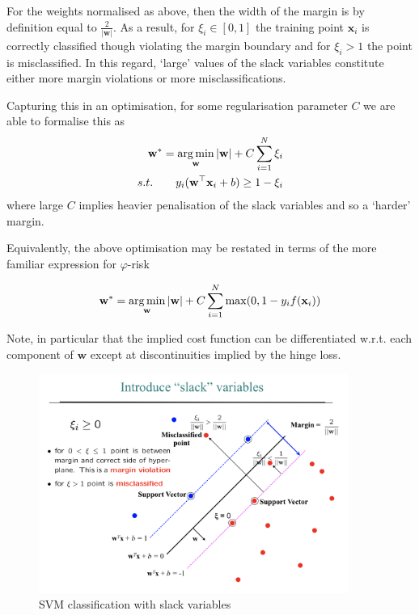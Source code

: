 For the weights normalised as above, then the width of the margin is by definition equal to $\frac{2}{|\mathbf{w}|}$. As a result, for $\xi_i \in [0,1]$ the training point $\mathbf{x}_i$ is correctly classified though violating the margin boundary and for $\xi_i>1$ the point is misclassified. In this regard, `large' values of the slack variables constitute either more margin violations or more misclassifications.

Capturing this in an optimisation, for some regularisation parameter $C$ we are able to formalise this as
\begin{align}
\mathbf{w}^*=\operatorname*{arg\,min}_\mathbf{w} |\mathbf{w} |+ C\sum_{i=1}^N\xi_i\\
 s.t. \qquad y_i(\mathbf{w}^\top\mathbf{x}_i+b)\ge1-\xi_i
\end{align}
where large $C$ implies heavier penalisation of the slack variables and so a `harder' margin.

Equivalently, the above optimisation may be restated in terms of the more familiar expression for $\varphi$-risk

\begin{align}
\mathbf{w}^*=\operatorname*{arg\,min}_\mathbf{w} |\mathbf{w} |+ C\sum_{i=1}^N\max(0,1-y_if(\mathbf{x}_i))
\end{align}

Note, in particular that the implied cost function can be differentiated w.r.t. each component of $\mathbf{w}$ except at discontinuities implied by the hinge loss.

\begin{figure}
\center
\includegraphics[width=0.9\textwidth]{img/slack_var.png}
\caption{SVM classification with slack variables}
\label{fig:svm_slack}
\end{figure}


